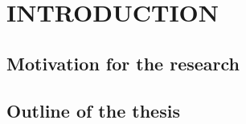 \section{INTRODUCTION} \label{sec:itroduction}

\subsection{Motivation for the research}

\subsection{Outline of the thesis}
